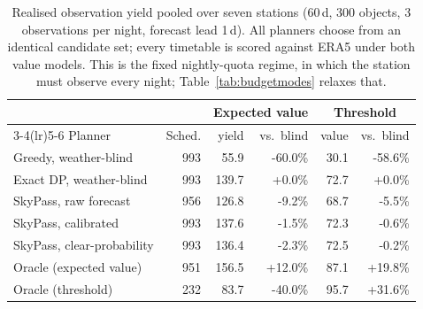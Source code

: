 \begin{table}[t]
\caption{Realised observation yield pooled over seven stations (60\,d, 300 objects, 3 observations per night, forecast lead 1\,d). All planners choose from an identical candidate set; every timetable is scored against ERA5 under both value models. This is the fixed nightly-quota regime, in which the station must observe every night; Table~\ref{tab:budgetmodes} relaxes that.}
\label{tab:weathervalue}
\centering
\begin{tabular}{lrrrrr}
\toprule
& & \multicolumn{2}{c}{Expected value} & \multicolumn{2}{c}{Threshold} \\
\cmidrule(lr){3-4}\cmidrule(lr){5-6}
Planner & Sched. & yield & vs.\ blind & value & vs.\ blind \\
\midrule
Greedy, weather-blind & 993 & 55.9 & -60.0\% & 30.1 & -58.6\% \\
Exact DP, weather-blind & 993 & 139.7 & +0.0\% & 72.7 & +0.0\% \\
SkyPass, raw forecast & 956 & 126.8 & -9.2\% & 68.7 & -5.5\% \\
SkyPass, calibrated & 993 & 137.6 & -1.5\% & 72.3 & -0.6\% \\
SkyPass, clear-probability & 993 & 136.4 & -2.3\% & 72.5 & -0.2\% \\
\midrule
Oracle (expected value) & 951 & 156.5 & +12.0\% & 87.1 & +19.8\% \\
Oracle (threshold) & 232 & 83.7 & -40.0\% & 95.7 & +31.6\% \\
\bottomrule
\end{tabular}
\end{table}
